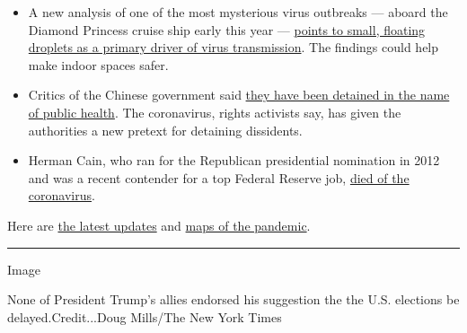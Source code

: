 \begin{itemize}
\item
  A new analysis of one of the most mysterious virus outbreaks ---
  aboard the Diamond Princess cruise ship early this year ---
  \href{https://www.nytimes.com/2020/07/30/health/diamond-princess-coronavirus-aerosol.html}{points
  to small, floating droplets as a primary driver of virus
  transmission}. The findings could help make indoor spaces safer.
\item
  Critics of the Chinese government said
  \href{https://www.nytimes.com/2020/07/30/world/asia/coronavirus-china-quarantine.html}{they
  have been detained in the name of public health}. The coronavirus,
  rights activists say, has given the authorities a new pretext for
  detaining dissidents.
\item
  Herman Cain, who ran for the Republican presidential nomination in
  2012 and was a recent contender for a top Federal Reserve job,
  \href{https://www.nytimes.com/2020/07/30/us/politics/herman-cain-dead.html}{died
  of the coronavirus}.
\end{itemize}

Here are
\href{https://nl.nytimes.com/f/newsletter/FAW2T_tCgpcMyKyApW1AiQ~~/AAAAAQA~/RgRhBbpEP0TuaHR0cHM6Ly93d3cubnl0aW1lcy5jb20vMjAyMC8wNy8zMC93b3JsZC9jb3JvbmF2aXJ1cy1jb3ZpZC0xOS5odG1sP2NhbXBhaWduX2lkPTcmZW1jPWVkaXRfTUJBRV9wXzIwMjAwNzMwJmluc3RhbmNlX2lkPTIwODM1Jm5sPW1vcm5pbmctYnJpZWZpbmcmcmVnaV9pZD0yNjA5MzM1JnNlY3Rpb249dG9wTmV3cyZzZWdtZW50X2lkPTM0ODI0JnRlPTEmdXNlcl9pZD03YjA1ZjZlZjNiYWIyYTg4Zjg0OGFlMTA3NDcxNDBjOVcDbnl0QgoAKUQ1I18PSP0MUhRzaWRhY2tlckBueXRpbWVzLmNvbVgEAAAAAA~~}{the
latest updates} and
\href{https://nl.nytimes.com/f/a/wa39ai_eHF78RAlaoDMmKw~~/AAAAAQA~/RgRhBbpEP0TwaHR0cHM6Ly93d3cubnl0aW1lcy5jb20vaW50ZXJhY3RpdmUvMjAyMC93b3JsZC9jb3JvbmF2aXJ1cy1tYXBzLmh0bWw_Y2FtcGFpZ25faWQ9NyZlbWM9ZWRpdF9NQkFFX3BfMjAyMDA3MzAmaW5zdGFuY2VfaWQ9MjA4MzUmbmw9bW9ybmluZy1icmllZmluZyZyZWdpX2lkPTI2MDkzMzUmc2VjdGlvbj10b3BOZXdzJnNlZ21lbnRfaWQ9MzQ4MjQmdGU9MSZ1c2VyX2lkPTdiMDVmNmVmM2JhYjJhODhmODQ4YWUxMDc0NzE0MGM5VwNueXRCCgApRDUjXw9I_QxSFHNpZGFja2VyQG55dGltZXMuY29tWAQAAAAA}{maps
of the pandemic}.

\begin{center}\rule{0.5\linewidth}{\linethickness}\end{center}

Image

None of President Trump's allies endorsed his suggestion the the U.S.
elections be delayed.Credit...Doug Mills/The New York Times


